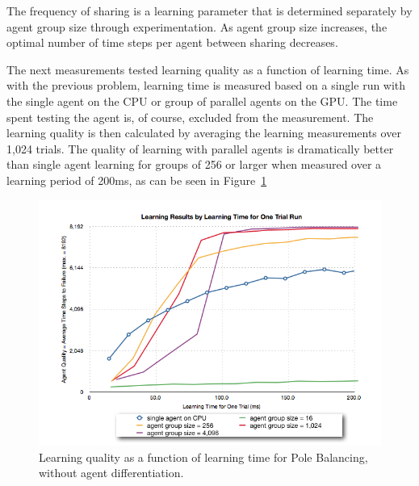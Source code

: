 \begin{flushleft}

The frequency of sharing is a learning parameter that is determined separately by agent group size through experimentation.  As agent group size increases, the optimal number of time steps per agent between sharing decreases. 

The next measurements tested learning quality as a function of learning time.  As with the previous problem, learning time is measured based on a single run with the single agent on the CPU or group of parallel agents on the GPU.  The time spent testing the agent is, of course, excluded from the measurement.  The learning quality is then calculated by averaging the learning measurements over 1,024 trials.  The quality of learning with parallel agents is dramatically better than single agent learning for groups of 256 or larger when measured over a learning period of 200ms, as can be seen in Figure~\ref{fig:pole_time}


\end{flushleft}

\begin{figure}[hbtp]
\center
\includegraphics[scale=0.35]{fig08a}
\caption{Learning quality as a function of learning time for Pole Balancing, without agent differentiation.}
\label{fig:pole_time}
\end{figure}

